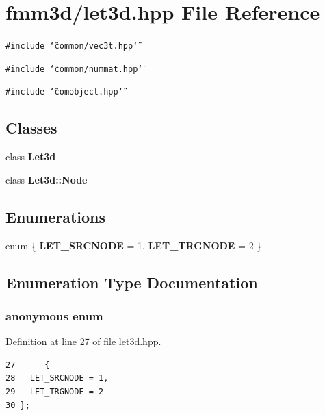 \section{fmm3d/let3d.hpp File Reference}
\label{let3d_8hpp}


{\tt \#include \char`\"{}common/vec3t.hpp\char`\"{}}\par
{\tt \#include \char`\"{}common/nummat.hpp\char`\"{}}\par
{\tt \#include \char`\"{}comobject.hpp\char`\"{}}\par
\subsection*{Classes}
\begin{CompactItemize}
\item 
class {\bf Let3d}
\item 
class {\bf Let3d::Node}
\end{CompactItemize}
\subsection*{Enumerations}
\begin{CompactItemize}
\item 
enum \{ {\bf LET\_\-SRCNODE} =  1, 
{\bf LET\_\-TRGNODE} =  2
 \}
\end{CompactItemize}


\subsection{Enumeration Type Documentation}
\subsubsection{\setlength{\rightskip}{0pt plus 5cm}anonymous enum}\label{let3d_8hpp_dca29a1140aadadfd92b34a02fa516ef_dca29a1140aadadfd92b34a02fa516ef}


\begin{Desc}
\item[Enumerator: ]\par
\begin{description}
\item[{\em 
LET\_\-SRCNODE\label{let3d_8hpp_dca29a1140aadadfd92b34a02fa516ef_dca29a1140aadadfd92b34a02fa516efe23071a0d32250c65112870fb95ab228}
}]\item[{\em 
LET\_\-TRGNODE\label{let3d_8hpp_dca29a1140aadadfd92b34a02fa516ef_dca29a1140aadadfd92b34a02fa516ef26c061b987248c77fad76816bc5c6fc5}
}]\end{description}
\end{Desc}



Definition at line 27 of file let3d.hpp.

\footnotesize\begin{verbatim}27      {
28   LET_SRCNODE = 1,
29   LET_TRGNODE = 2
30 };
\end{verbatim}\normalsize 


